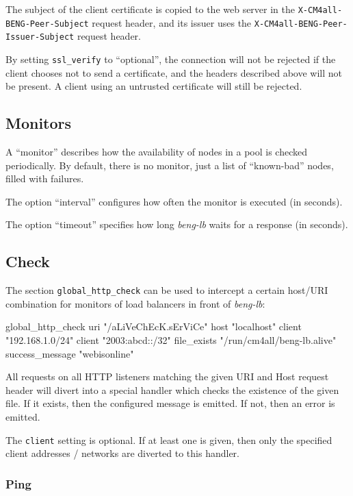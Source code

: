 \documentclass[a4paper,12pt]{article}
\begin{document}
The subject of the client certificate is copied to the web server in
the \verb|X-CM4all-BENG-Peer-Subject| request header, and its issuer
uses the \verb|X-CM4all-BENG-Peer-Issuer-Subject| request header.

By setting \verb|ssl_verify| to ``optional'', the connection will not
be rejected if the client chooses not to send a certificate, and the
headers described above will not be present.  A client using an
untrusted certificate will still be rejected.

\subsection{Monitors}

A ``monitor'' describes how the availability of nodes in a pool is
checked periodically.  By default, there is no monitor, just a list of
``known-bad'' nodes, filled with failures.

The option ``interval'' configures how often the monitor is executed
(in seconds).

The option ``timeout'' specifies how long \emph{beng-lb} waits for a
response (in seconds).

\subsection{Check}

The section \verb|global_http_check| can be used to intercept a
certain host/URI combination for monitors of load balancers in front
of \emph{beng-lb}:

\begin{verbatim*}
global_http_check {
  uri "/aLiVeChEcK.sErViCe"
  host "localhost"
  client "192.168.1.0/24"
  client "2003:abcd::/32"
  file_exists "/run/cm4all/beng-lb.alive"
  success_message "webisonline"
}
\end{verbatim*}

All requests on all HTTP listeners matching the given URI and Host
request header will divert into a special handler which checks the
existence of the given file.  If it exists, then the configured
message is emitted.  If not, then an error is emitted.

The \verb|client| setting is optional.  If at least one is given, then
only the specified client addresses / networks are diverted to this
handler.

\subsubsection{Ping}
\end{document}
